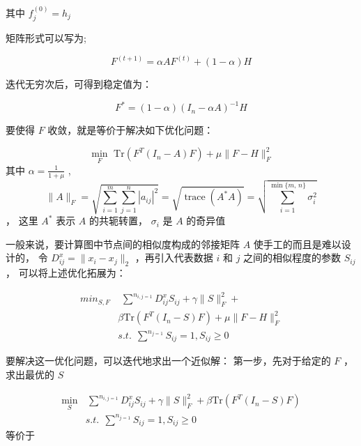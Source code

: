 \documentclass[color=gray,base=hide,cn]{elegantbook}
\begin{document}
其中 $f^{(0)}_j = h_j$

矩阵形式可以写为;

\begin{equation}
    {F}^{(t+1)} = \alpha {A} {F}^{(t)} + (1-\alpha){H}
\end{equation}

迭代无穷次后，可得到稳定值为：

\begin{equation}
    {F}^{*} = (1-\alpha) (I_n - \alpha A)^{-1}{H}
\end{equation}

要使得 $F$ 收敛，就是等价于解决如下优化问题：

\begin{equation}
    \min_{F} \,\, \mathrm{Tr} (F^{T}(I_n - A) F) + \mu \|F - H\|^2_F
\end{equation}
其中 $\alpha = \frac{1}{1+\mu}$ ,
\begin{equation}
    \|A\|_F=\sqrt{\sum_{i=1}^m\sum_{j=1}^n |a_{ij}|^2}=\sqrt{\operatorname{trace}(A^* A)}=\sqrt{\sum_{i=1}^{\min\{m,\,n\}} \sigma_{i}^2}
\end{equation}
，
这里 $A^*$ 表示 $A$ 的共轭转置， $\sigma_{i}$ 是 $A$ 的奇异值

一般来说，要计算图中节点间的相似度构成的邻接矩阵 $A$ 使手工的而且是难以设计的，
令 $D^x_{ij}=\|x_i-x_j\|_2$ ，再引入代表数据 $i$ 和 $j$ 之间的相似程度的参数 $S_{ij}$ ， 可以将上述优化拓展为：

\begin{equation}
    \begin{aligned}
        min_{S,F} & \,\,   \sum^n\nolimits_{i,j=1}D^x_{ij}S_{ij}+\gamma \|S\|^2_F+ \\ &  \beta \mathrm{Tr} (F^{T}(I_n - S) F) + \mu \|F - H\|^2_F  \\ &  s.t. \ \ \sum^n\nolimits_{j=1}S_{ij}=1, S_{ij}\geq 0
    \end{aligned}
\end{equation}

要解决这一优化问题，可以迭代地求出一个近似解：
第一步，先对于给定的 $F$ ，求出最优的 $S$

\begin{equation}
    \begin{aligned}
        \min_{S} & \, \sum^n\nolimits_{i,j=1}D^x_{ij}S_{ij}+\gamma \|S\|^2_F+ \beta \mathrm{Tr} (F^{T}(I_n - S) F)
        \\ & s.t. \ \ \sum^n\nolimits_{j=1}S_{ij}=1, S_{ij}\geq 0
    \end{aligned}
\end{equation}
等价于
\end{document}
